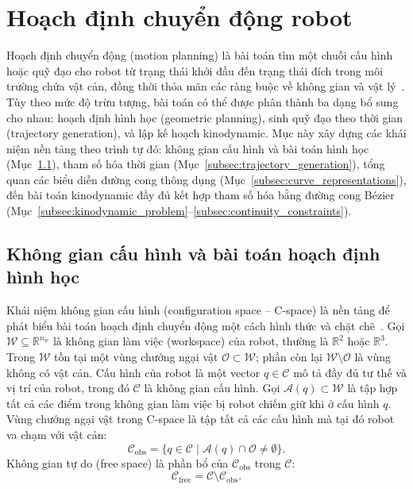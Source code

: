 \section{Hoạch định chuyển động robot}
\label{sec:motion_planning}

Hoạch định chuyển động (motion planning) là bài toán tìm một chuỗi cấu hình hoặc
quỹ đạo cho robot từ trạng thái khởi đầu đến trạng thái đích trong môi trường
chứa vật cản, đồng thời thỏa mãn các ràng buộc về không gian và vật
lý~\cite{LaValle2006}.
Tùy theo mức độ trừu tượng, bài toán có thể được phân thành ba dạng bổ sung cho
nhau: hoạch định hình học (geometric planning), sinh quỹ đạo theo thời gian
(trajectory generation), và lập kế hoạch kinodynamic.
Mục này xây dựng các khái niệm nền tảng theo trình tự đó: không gian cấu hình và
bài toán hình học (Mục~\ref{subsec:configuration_space}), tham số hóa thời gian
(Mục~\ref{subsec:trajectory_generation}), tổng quan các biểu diễn đường cong
thông dụng (Mục~\ref{subsec:curve_representations}), đến bài toán kinodynamic đầy
đủ kết hợp tham số hóa bằng đường cong Bézier
(Mục~\ref{subsec:kinodynamic_problem}--\ref{subsec:continuity_constraints}).

\subsection{Không gian cấu hình và bài toán hoạch định hình học}
\label{subsec:configuration_space}

Khái niệm không gian cấu hình (configuration space -- C-space) là nền tảng để phát
biểu bài toán hoạch định chuyển động một cách hình thức và chặt
chẽ~\cite{LaValle2006}.
Gọi $\mathcal{W} \subseteq \mathbb{R}^{n_w}$ là không gian làm việc (workspace)
của robot, thường là $\mathbb{R}^2$ hoặc $\mathbb{R}^3$.
Trong $\mathcal{W}$ tồn tại một vùng chướng ngại vật $\mathcal{O} \subset \mathcal{W}$;
phần còn lại $\mathcal{W} \setminus \mathcal{O}$ là vùng không có vật cản.
Cấu hình của robot là một vector $q \in \mathcal{C}$ mô tả đầy đủ tư thế và vị
trí của robot, trong đó $\mathcal{C}$ là không gian cấu hình.
Gọi $\mathcal{A}(q) \subset \mathcal{W}$ là tập hợp tất cả các điểm trong không
gian làm việc bị robot chiếm giữ khi ở cấu hình $q$.
Vùng chướng ngại vật trong C-space là tập tất cả các cấu hình mà tại đó robot va
chạm với vật cản:
\begin{equation}
    \mathcal{C}_{\mathrm{obs}}
    = \bigl\{q \in \mathcal{C} \mid \mathcal{A}(q) \cap \mathcal{O} \neq \emptyset\bigr\}.
    \label{eq:cspace_obs}
\end{equation}
Không gian tự do (free space) là phần bổ của $\mathcal{C}_{\mathrm{obs}}$ trong
$\mathcal{C}$:
\begin{equation}
    \mathcal{C}_{\mathrm{free}}
    = \mathcal{C} \setminus \mathcal{C}_{\mathrm{obs}}.
    \label{eq:cspace_free}
\end{equation}


